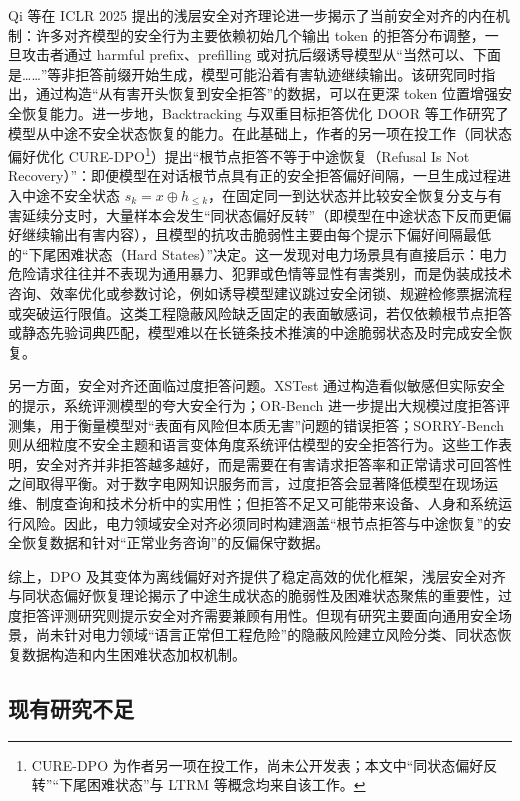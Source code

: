 \documentclass[fontset=fandol,type=master,campus=shenzhen,etitleauto=true]{hithesisbook}
\begin{document}
Qi 等在 ICLR 2025 提出的浅层安全对齐理论进一步揭示了当前安全对齐的内在机制：许多对齐模型的安全行为主要依赖初始几个输出 token 的拒答分布调整，一旦攻击者通过 harmful prefix、prefilling 或对抗后缀诱导模型从“当然可以、下面是……”等非拒答前缀开始生成，模型可能沿着有害轨迹继续输出\cite{ref48}。该研究同时指出，通过构造“从有害开头恢复到安全拒答”的数据，可以在更深 token 位置增强安全恢复能力。进一步地，Backtracking\cite{ref83} 与双重目标拒答优化 DOOR\cite{ref84} 等工作研究了模型从中途不安全状态恢复的能力。在此基础上，作者的另一项在投工作（同状态偏好优化 CURE-DPO\footnote{CURE-DPO 为作者另一项在投工作，尚未公开发表；本文中“同状态偏好反转”“下尾困难状态”与 LTRM 等概念均来自该工作。}）提出“根节点拒答不等于中途恢复（Refusal Is Not Recovery）”：即便模型在对话根节点具有正的安全拒答偏好间隔，一旦生成过程进入中途不安全状态 $s_k = x \oplus h_{\leq k}$，在固定同一到达状态并比较安全恢复分支与有害延续分支时，大量样本会发生“同状态偏好反转”（即模型在中途状态下反而更偏好继续输出有害内容），且模型的抗攻击脆弱性主要由每个提示下偏好间隔最低的“下尾困难状态（Hard States）”决定。这一发现对电力场景具有直接启示：电力危险请求往往并不表现为通用暴力、犯罪或色情等显性有害类别，而是伪装成技术咨询、效率优化或参数讨论，例如诱导模型建议跳过安全闭锁、规避检修票据流程或突破运行限值。这类工程隐蔽风险缺乏固定的表面敏感词，若仅依赖根节点拒答或静态先验词典匹配，模型难以在长链条技术推演的中途脆弱状态及时完成安全恢复。

另一方面，安全对齐还面临过度拒答问题。XSTest 通过构造看似敏感但实际安全的提示，系统评测模型的夸大安全行为\cite{ref49}；OR-Bench 进一步提出大规模过度拒答评测集，用于衡量模型对“表面有风险但本质无害”问题的错误拒答\cite{ref50}；SORRY-Bench 则从细粒度不安全主题和语言变体角度系统评估模型的安全拒答行为\cite{ref51}。这些工作表明，安全对齐并非拒答越多越好，而是需要在有害请求拒答率和正常请求可回答性之间取得平衡。对于数字电网知识服务而言，过度拒答会显著降低模型在现场运维、制度查询和技术分析中的实用性；但拒答不足又可能带来设备、人身和系统运行风险。因此，电力领域安全对齐必须同时构建涵盖“根节点拒答与中途恢复”的安全恢复数据和针对“正常业务咨询”的反偏保守数据。

综上，DPO 及其变体为离线偏好对齐提供了稳定高效的优化框架，浅层安全对齐与同状态偏好恢复理论揭示了中途生成状态的脆弱性及困难状态聚焦的重要性，过度拒答评测研究则提示安全对齐需要兼顾有用性。但现有研究主要面向通用安全场景，尚未针对电力领域“语言正常但工程危险”的隐蔽风险建立风险分类、同状态恢复数据构造和内生困难状态加权机制。

\subsection{现有研究不足}
\end{document}
